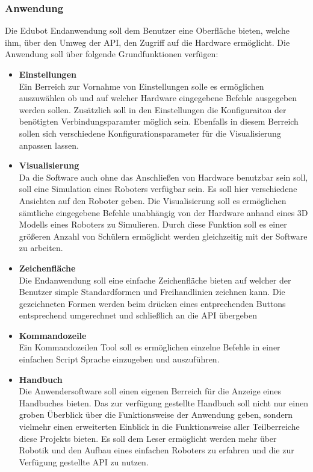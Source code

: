 \subsubsection{Anwendung}
Die Edubot Endanwendung soll dem Benutzer eine Oberfläche bieten, welche ihm, über den Umweg der API, den Zugriff auf die Hardware ermöglicht. Die Anwendung soll über folgende Grundfunktionen verfügen:
\begin{itemize}
\item \textbf{Einstellungen}\\
Ein Berreich zur Vornahme von Einstellungen solle es ermöglichen auszuwählen ob und auf welcher Hardware eingegebene Befehle ausgegeben werden sollen. Zusätzlich soll in den Einstellungen die Konfiguraiton der benötigten Verbindungsparamter möglich sein. Ebenfalls in diesem Berreich sollen sich verschiedene Konfigurationsparameter für die Visualisierung anpassen lassen.
\item \textbf{Visualisierung}\\
Da die Software auch ohne das Anschließen von Hardware benutzbar sein soll, soll eine Simulation eines Roboters verfügbar sein. Es soll hier verschiedene Ansichten auf den Roboter geben. Die Visualisierung soll es ermöglichen sämtliche eingegebene Befehle unabhängig von der Hardware anhand eines 3D Modells eines Roboters zu Simulieren. Durch diese Funktion soll es einer größeren Anzahl von Schülern ermöglicht werden gleichzeitig mit der Software zu arbeiten.
\item \textbf{Zeichenfläche}\\
Die Endanwendung soll eine einfache Zeichenfläche bieten auf welcher der Benutzer simple Standardformen und Freihandlinien zeichnen kann. Die gezeichneten Formen werden beim drücken eines entprechenden Buttons entsprechend umgerechnet und schließlich an die API übergeben
\item \textbf{Kommandozeile}\\
Ein Kommandozeilen Tool soll es ermöglichen einzelne Befehle in einer einfachen Script Sprache einzugeben und auszuführen.
\item \textbf{Handbuch}\\
Die Anwendersoftware soll einen eigenen Berreich für die Anzeige eines Handbuches bieten. Das zur verfügung gestellte Handbuch soll nicht nur einen groben Überblick über die Funktionsweise der Anwendung geben, sondern vielmehr einen erweiterten Einblick in die Funktionsweise aller Teilberreiche diese Projekts bieten. Es soll dem Leser ermöglicht werden mehr über Robotik und den Aufbau eines einfachen Roboters zu erfahren und die zur Verfügung gestellte API zu nutzen.
\end{itemize}
